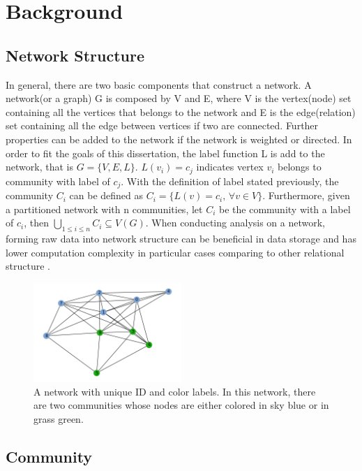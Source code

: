 \documentclass[12pt]{article}
\begin{document}
\section{Background}
\subsection{Network Structure}

In general, there are two basic components that construct a network. A network(or a graph) G is composed by V and E, where V is the vertex(node) set containing all the vertices that belongs to the network and E is the edge(relation) set containing all the edge between vertices if two are connected. Further properties can be added to the network if the network is weighted or directed. In order to fit the goals of this dissertation, the label function L is add to the network, that is $G = \{V,E,L\}$. $L(v_i) = c_j$ indicates vertex $v_i$ belongs to community with label of $c_j$. With the definition of label stated previously, the community $C_i$ can be defined as $C_i = \{ L(v) = c_i \text{, } \forall v \in V \}$. 
Furthermore, given a partitioned network with n communities, let $C_i$ be the community with a label of $c_i$, then 
$\bigcup_{1 \leq i \leq n} C_i \subseteq V(G)$. When conducting analysis on a network, forming raw data into network structure can be beneficial in data storage and has lower computation complexity in particular cases comparing to other relational structure \cite{6}.

\bigskip


\begin{figure}
\centering
\includegraphics[width=0.5\textwidth]{fig_1.png}
\caption{\label{fig:fig_1}A network with unique ID and color labels. In this network, there are two communities whose nodes are either colored in sky blue or in grass green.}
\end{figure}


\subsection{Community}
\end{document}
